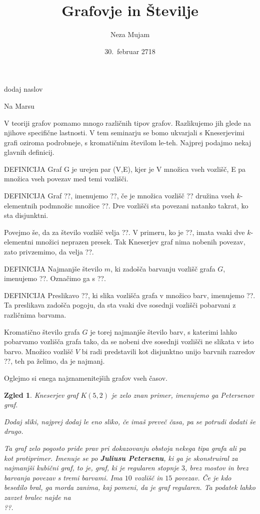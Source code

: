 \documentclass[a4paper,12pt]{article}
\title{Grafovje in Številje}
\author{Neza Mujam}
\date{30.\ februar 2718}
\newtheorem{zgled}{Zgled}
\begin{document}
 
dodaj naslov


Na Marsu

V teoriji grafov poznamo mnogo različnih tipov grafov. Razlikujemo jih glede na njihove specifične lastnosti. V tem seminarju se bomo ukvarjali s Kneserjevimi grafi oziroma podrobneje, s kromatičnim številom le-teh. Najprej podajmo nekaj glavnih definicij.


DEFINICIJA
Graf G je urejen par (V,E), kjer je V množica vseh vozlišč, E pa množica vseh povezav med temi vozlišči.

DEFINICIJA
Graf ??, imenujemo ??, če je množica vozlišč ?? družina vseh $k$-elementnih podmnožic množice ??. Dve vozlišči sta povezani natanko takrat, ko sta disjunktni. 


Povejmo še, da za število vozlišč velja ??. V primeru, ko je ??, imata vsaki dve $k$-elementni množici neprazen presek. Tak Kneserjev graf nima nobenih povezav, zato privzemimo, da velja ??.

DEFINICIJA
Najmanjše število $m$, ki zadošča barvanju vozlišč grafa $G$, imenujemo ??. Označimo ga s ??.

DEFINICIJA
Preslikavo ??, ki slika vozlišča grafa v množico barv, imenujemo ??. Ta preslikava zadošča pogoju, da sta vsaki dve sosednji vozlišči pobarvani z različnima barvama.


Kromatično število grafa $G$ je torej najmanjše število barv, s katerimi lahko pobarvamo vozlišča grafa tako, da se nobeni dve sosednji vozlišči ne slikata v isto barvo. Množico vozlišč $V$ bi radi predstavili kot disjunktno unijo barvnih razredov ??, teh pa želimo, da je najmanj.



Oglejmo si enega najznamenitejših grafov vseh časov.

\begin{zgled}{Kneserjev graf $K(5,2)$ je zelo znan primer, imenujemo ga Petersenov graf. 

Dodaj sliki, najprej dodaj le eno sliko, če imaš preveč časa, pa se potrudi dodati še drugo.

Ta graf zelo pogosto pride prav pri dokazovanju obstoja nekega tipa grafa ali pa kot protiprimer. Imenuje se po \textbf{Juliusu Petersenu}, ki ga je skonstruiral za najmanjši kubični graf, to je, graf, ki je regularen stopnje $3$, brez mostov in brez barvanja povezav s tremi barvami. Ima $10$ vozlišč in $15$ povezav. Če je kdo besedilo bral, ga morda zanima, kaj pomeni, da je graf regularen. Ta podatek lahko zavzet bralec najde na \\ 
??.
}
\end{zgled}
\end{document}
